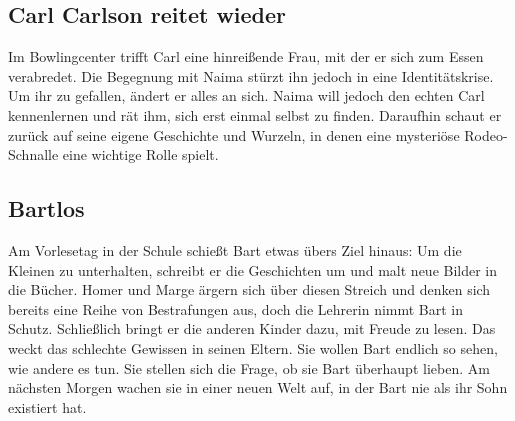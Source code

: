 \subsection{Carl Carlson reitet wieder}\label{OABF08}
Im Bowlingcenter trifft Carl eine hinreißende Frau, mit der er sich zum Essen verabredet. Die Begegnung mit Naima stürzt ihn jedoch in eine Identitätskrise. Um ihr zu gefallen, ändert er alles an sich. Naima will jedoch den echten Carl kennenlernen und rät ihm, sich erst einmal selbst zu finden. Daraufhin schaut er zurück auf seine eigene Geschichte und Wurzeln, in denen eine mysteriöse Rodeo-Schnalle eine wichtige Rolle spielt.


\subsection{Bartlos}
Am Vorlesetag in der Schule schießt Bart etwas übers Ziel hinaus: Um die Kleinen zu unterhalten, schreibt er die Geschichten um und malt neue Bilder in die Bücher. Homer und Marge ärgern sich über diesen Streich und denken sich bereits eine Reihe von Bestrafungen aus, doch die Lehrerin nimmt Bart in Schutz. Schließlich bringt er die anderen Kinder dazu, mit Freude zu lesen. Das weckt das schlechte Gewissen in seinen Eltern. Sie wollen Bart endlich so sehen, wie andere es tun. Sie stellen sich die Frage, ob sie Bart überhaupt lieben. Am nächsten Morgen wachen sie in einer neuen Welt auf, in der Bart nie als ihr Sohn existiert hat.